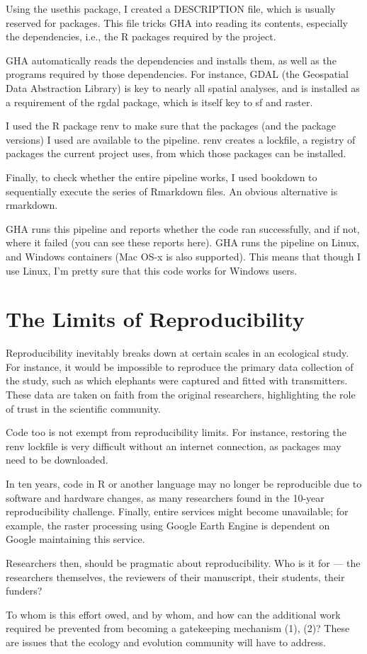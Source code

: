 \begin{tcolorbox}[
  blanker,
  width=0.99\textwidth,
  before skip=6pt,
  colback=gray,
  breakable]
{    Using the usethis package, I created a DESCRIPTION file, which is usually reserved for packages. This file tricks GHA into reading its contents, especially the dependencies, i.e., the R packages required by the project.

    GHA automatically reads the dependencies and installs them, as well as the programs required by those dependencies. For instance, GDAL (the Geospatial Data Abstraction Library) is key to nearly all spatial analyses, and is installed as a requirement of the rgdal package, which is itself key to sf and raster.

    I used the R package renv to make sure that the packages (and the package versions) I used are available to the pipeline. renv creates a lockfile, a registry of packages the current project uses, from which those packages can be installed.

    Finally, to check whether the entire pipeline works, I used bookdown to sequentially execute the series of Rmarkdown files. An obvious alternative is rmarkdown.

    GHA runs this pipeline and reports whether the code ran successfully, and if not, where it failed (you can see these reports here). GHA runs the pipeline on Linux, and Windows containers (Mac OS-x is also supported). This means that though I use Linux, I’m pretty sure that this code works for Windows users.

    \section{The Limits of Reproducibility}

    Reproducibility inevitably breaks down at certain scales in an ecological study. For instance, it would be impossible to reproduce the primary data collection of the study, such as which elephants were captured and fitted with transmitters. These data are taken on faith from the original researchers, highlighting the role of trust in the scientific community.

    Code too is not exempt from reproducibility limits. For instance, restoring the renv lockfile is very difficult without an internet connection, as packages may need to be downloaded.

    In ten years, code in R or another language may no longer be reproducible due to software and hardware changes, as many researchers found in the 10-year reproducibility challenge. Finally, entire services might become unavailable; for example, the raster processing using Google Earth Engine is dependent on Google maintaining this service.

    Researchers then, should be pragmatic about reproducibility. Who is it for — the researchers themselves, the reviewers of their manuscript, their students, their funders?

    To whom is this effort owed, and by whom, and how can the additional work required be prevented from becoming a gatekeeping mechanism (1), (2)? These are issues that the ecology and evolution community will have to address.
}

\end{tcolorbox}
